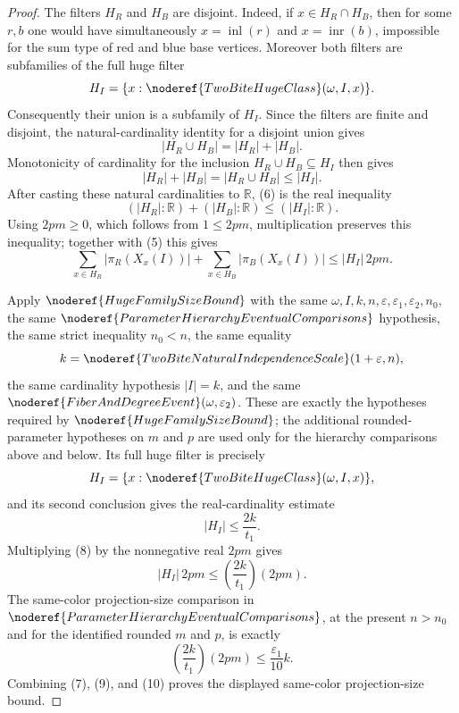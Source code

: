 \begin{proof}
The filters \(H_R\) and \(H_B\) are disjoint.  Indeed, if
\(x\in H_R\cap H_B\), then for some \(r,b\) one would have simultaneously
\(x=\operatorname{inl}(r)\) and \(x=\operatorname{inr}(b)\), impossible for the
sum type of red and blue base vertices.  Moreover both filters are subfamilies
of the full huge filter
\[
H_I=\{x:\noderef{TwoBiteHugeClass}(\omega,I,x)\}.
\]
Consequently their union is a subfamily of \(H_I\).  Since the filters are
finite and disjoint, the natural-cardinality identity for a disjoint union
gives
\[
|H_R\cup H_B|=|H_R|+|H_B|.
\]
Monotonicity of cardinality for the inclusion \(H_R\cup H_B\subseteq H_I\)
then gives
\[
|H_R|+|H_B|=|H_R\cup H_B|\le |H_I|. \tag{6}
\]
After casting these natural cardinalities to \(\mathbb R\), (6) is the real
inequality
\[
(|H_R|:\mathbb R)+(|H_B|:\mathbb R)\le (|H_I|:\mathbb R).
\]
Using \(2pm\ge0\), which follows from \(1\le2pm\), multiplication preserves
this inequality; together with (5) this gives
\[
\sum_{x\in H_R}|\pi_R(X_x(I))|
+
\sum_{x\in H_B}|\pi_B(X_x(I))|
\le |H_I|\,2pm. \tag{7}
\]

Apply \(\noderef{HugeFamilySizeBound}\) with the same
\(\omega,I,k,n,\varepsilon,\varepsilon_1,\varepsilon_2,n_0\), the same
\(\noderef{ParameterHierarchyEventualComparisons}\) hypothesis, the same
strict inequality \(n_0<n\), the same equality
\[
k=\noderef{TwoBiteNaturalIndependenceScale}(1+\varepsilon,n),
\]
the same cardinality hypothesis \(|I|=k\), and the same
\(\noderef{FiberAndDegreeEvent}(\omega,\varepsilon_2)\).  These are exactly
the hypotheses required by \(\noderef{HugeFamilySizeBound}\); the additional
rounded-parameter hypotheses on \(m\) and \(p\) are used only for the
hierarchy comparisons above and below.  Its full huge filter is precisely
\[
H_I=\{x:\noderef{TwoBiteHugeClass}(\omega,I,x)\},
\]
and its second conclusion gives the real-cardinality estimate
\[
|H_I|\le\frac{2k}{t_1}. \tag{8}
\]
Multiplying (8) by the nonnegative real \(2pm\) gives
\[
|H_I|\,2pm
\le
\left(\frac{2k}{t_1}\right)(2pm). \tag{9}
\]
The same-color projection-size comparison in
\(\noderef{ParameterHierarchyEventualComparisons}\), at the present
\(n>n_0\) and for the identified rounded \(m\) and \(p\), is exactly
\[
\left(\frac{2k}{t_1}\right)(2pm)
\le
\frac{\varepsilon_1}{10}k. \tag{10}
\]
Combining (7), (9), and (10) proves the displayed same-color projection-size
bound.
\end{proof}

